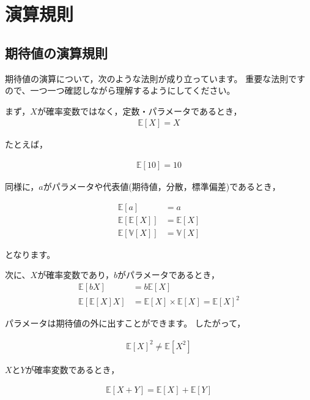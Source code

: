 \documentclass[
  letterpaper,
  pandoc,
  ja=standard,
  jafont = hiragino-pron]{ltjsbook}
\begin{document}
\section{演算規則}\label{ux6f14ux7b97ux898fux5247}

\subsection{期待値の演算規則}\label{ux671fux5f85ux5024ux306eux6f14ux7b97ux898fux5247}

期待値の演算について，次のような法則が成り立っています。
重要な法則ですので、一つ一つ確認しながら理解するようにしてください。

まず，\(X\)が確率変数ではなく，定数・パラメータであるとき， \[
\begin{aligned}
\mathbb{E} [X] = X
\end{aligned}
\]

たとえば，

\[
\begin{aligned}
\mathbb{E} [10] = 10
\end{aligned}
\]

同様に，\(a\)がパラメータや代表値(期待値，分散，標準偏差)であるとき，

\[
\begin{aligned}
\mathbb{E} [a] &= a\\
\mathbb{E} [ \mathbb{E}[X]] &= \mathbb{E}[X]\\
\mathbb{E} [\mathbb{V} [X]] &= \mathbb{V}[X]
\end{aligned}
\]

となります。

次に、\(X\)が確率変数であり，\(b\)がパラメータであるとき， \[
\begin{aligned}
\mathbb{E} [bX] &= b \mathbb{E}[X] \\
\mathbb{E} [\mathbb{E}[X] X] &= \mathbb{E}[X] \times \mathbb{E}[X] = \mathbb{E}[X]^2
\end{aligned}
\]

パラメータは期待値の外に出すことができます。 したがって，

\[
\begin{aligned}
\mathbb{E} [X]^2 \not = \mathbb{E} [X^2]
\end{aligned}
\]

\(X\)と\(Y\)が確率変数であるとき，

\[
\begin{aligned}
\mathbb{E}[X+Y] = \mathbb{E} [X] + \mathbb{E} [Y]
\end{aligned}
\]
\end{document}
